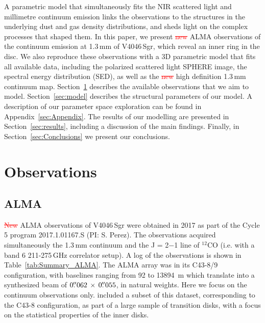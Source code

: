 \documentclass[fleqn,usenatbib,useAMS]{mnras}
\newcommand{\red}[1]{\textcolor{red}{#1}}
\begin{document}
A parametric model that simultaneously fits the NIR scattered light and millimetre continuum emission links the observations to the structures in the underlying dust and gas density distributions, and sheds light on the complex processes that shaped them. In this paper, we present \red{\sout{new}} ALMA observations of the continuum emission at 1.3\,mm of V4046\,Sgr, which reveal an inner ring in the disc. We also reproduce these observations with a 3D parametric model that fits all available data, including the polarized scattered light SPHERE image, the spectral energy distribution (SED), as well as the \red{\sout{new}} high definition 1.3\,mm continuum map. Section~\ref{sec:Observations} describes the available observations that we aim to model. Section~\ref{sec:model} describes the structural parameters of our model. A description of our parameter space exploration can be found in Appendix~\ref{sec:Appendix}. The results of our modelling are presented in Section~\ref{sec:results}, including a discussion of the main findings. Finally, in Section~\ref{sec:Conclusions} we present our conclusions.

\section{Observations} \label{sec:Observations}
\subsection{ALMA}  \label{subsec:ALMA}

\red{\sout{New}} ALMA observations of V4046\,Sgr were obtained in 2017 as part of the Cycle 5 program 2017.1.01167.S (PI: S. Perez). The observations acquired simultaneously the 1.3\,mm continuum and the J = 2$-$1 line of $^{12}$CO (i.e. with a band 6 211-275\,GHz correlator setup). A log of the observations is shown in Table~\ref{tab:Summary_ALMA}. The ALMA array was in its C43-8/9 configuration, with baselines ranging from 92 to 13894 \,m which translate into a synthesized beam of $0\hbox{$.\!\!^{\prime\prime}$}062 \,\times \, 0\hbox{$.\!\!^{\prime\prime}$}055$, in natural weights. Here we focus on the continuum observations only. \citet{Francis_2020} included a subset of this dataset, corresponding to the C43-8 configuration, as part of a large sample of transition disks, with a focus on the statistical properties of the inner disks.
\end{document}
